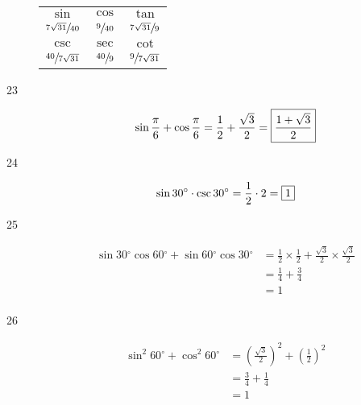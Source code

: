 \documentclass{exam}
\newcommand{\dg}{\ensuremath{^\circ}}
\begin{document}
\begin{description}
        \begin{tabular}[H]{ccc}
          \toprule
          $\sin$                    & $\cos$          & $\tan$                   \\
          $\sfrac{7 \sqrt{31}}{40}$ & $\sfrac{9}{40}$ & $\sfrac{7 \sqrt{31}}{9}$ \\

          \midrule

          $\csc$                    & $\sec$          & $\cot$ \\
          $\sfrac{40}{7 \sqrt{31}}$ & $\sfrac{40}{9}$ & $\sfrac{9}{7 \sqrt{31}}$ \\

          \bottomrule
        \end{tabular}

      \item[23]
        \[
          \sin \frac{\pi}{6} + \cos \frac{\pi}{6} = \frac{1}{2} + \frac{\sqrt{3}}{2} = \boxed{ \frac{1 + \sqrt{3}}{2} } \\
        \]

      \item[24]
        \[
          \sin 30 \dg \cdot \csc 30 \dg = \frac{1}{2} \cdot 2 = \boxed{ 1 } \\
        \]

      \item[25]
        \begin{align*}
          \sin 30 \dg \cos 60 \dg + \sin 60 \dg \cos 30 \dg & =
            \frac{1}{2} \times \frac{1}{2} + \frac{\sqrt{3}}{2} \times \frac{\sqrt{3}}{2} \\
          & = \frac{1}{4} + \frac{3}{4} \\
          &= \boxed{ 1 } \\
        \end{align*}

      \item[26]
        \begin{align*}
          \sin^2 60 \dg + \cos^2 60 \dg & = \left( \frac{\sqrt{3}}{2} \right)^2 + \left( \frac{1}{2} \right)^2 \\
                                        & = \frac{3}{4} + \frac{1}{4} \\
                                        & = \boxed{ 1 } \\
        \end{align*}

  

\end{description}
\end{document}
